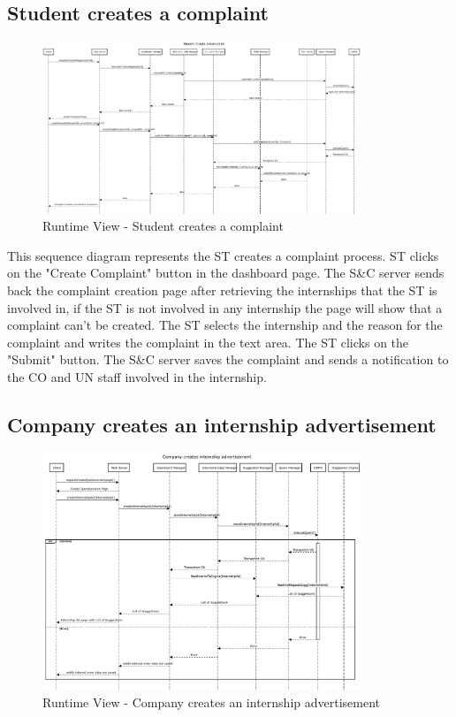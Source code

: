 \subsection{Student creates a complaint}
\label{sub:student-creates-a-complaint}%

\begin{figure}[H]
      \centering
      \includegraphics[width=0.85\textwidth]{Images/RV_05.pdf}
      \caption{Runtime View - Student creates a complaint}
      \label{fig:rv-student-creates-a-complaint}
\end{figure}

\par This sequence diagram represents the ST creates a complaint process. ST clicks on the "Create Complaint" button in the
dashboard page. The S\&C server sends back the complaint creation page after retrieving the internships that the ST is involved in, 
if the ST is not involved in any internship the page will show that a complaint can't be created. The ST selects the internship 
and the reason for the complaint and writes the complaint in the text area. The ST clicks on the "Submit" button. The S\&C server
saves the complaint and sends a notification to the CO and UN staff involved in the internship.


\subsection{Company creates an internship advertisement}

\begin{figure}[H]
      \centering
      \includegraphics[width=0.85\textwidth]{Images/RV_06.pdf}
      \caption{Runtime View - Company creates an internship advertisement}
      \label{fig:rv-company-creates-an-internship-advertisement}
\end{figure}

